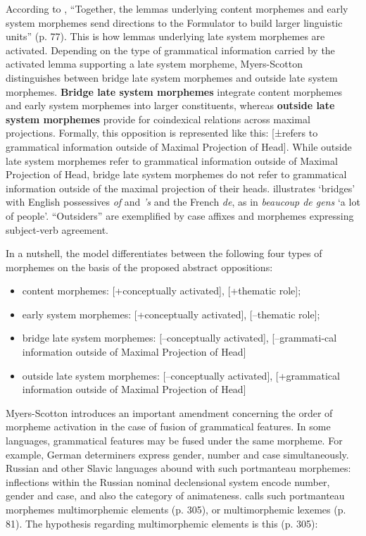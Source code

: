 According to \citet{myers-scotton-contact-2002}, ``Together, the lemmas underlying content morphemes and early system morphemes send directions to the Formulator to build larger linguistic units'' (p. 77). This is how lemmas underlying late system morphemes are activated. Depending on the type of grammatical information carried by the activated lemma supporting a late system morpheme, Myers-Scotton distinguishes between bridge late system morphemes and outside late system morphemes. \textbf{Bridge late system morphemes} integrate content morphemes and early system morphemes into larger constituents, whereas \textbf{outside late system morphemes} provide for coindexical relations across maximal projections. Formally, this opposition is represented like this: [±refers to grammatical information outside of Maximal Projection of Head]. While outside late system morphemes refer to grammatical information outside of Maximal Projection of Head, bridge late system morphemes do not refer to grammatical information outside of the maximal projection of their heads. \citet[75]{myers-scotton-contact-2002} illustrates `bridges' with English possessives \textit{of} and \textit{'s} and the French \textit{de}, as in \textit{beaucoup de gens} `a lot of people'. ``Outsiders'' are exemplified by case affixes and morphemes expressing subject-verb agreement.

In a nutshell, the model differentiates between the following four types of morphemes on the basis of the proposed abstract oppositions:
\begin{itemize} 
\item content morphemes: [+conceptually activated], [+thematic role];
\item early system morphemes: [+conceptually activated], [--thematic role];
\item bridge late system morphemes: [--conceptually activated], [--grammati-cal information outside of Maximal Projection of Head]
\item outside late system morphemes: [--conceptually activated], [+grammatical information outside of Maximal Projection of Head]
\end{itemize}

Myers-Scotton introduces an important amendment concerning the order of morpheme activation in the case of fusion of grammatical features. In some languages, grammatical features may be fused under the same morpheme. For example, German determiners express gender, number and case simultaneously. Russian and other Slavic languages abound with such portmanteau morphemes: inflections within the Russian nominal declensional system encode number, gender and case, and also the category of animateness. \citet[][]{myers-scotton-contact-2002} calls such portmanteau morphemes multimorphemic elements (p. 305), or multimorphemic lexemes (p. 81). The hypothesis regarding multimorphemic elements is this (p. 305): %

